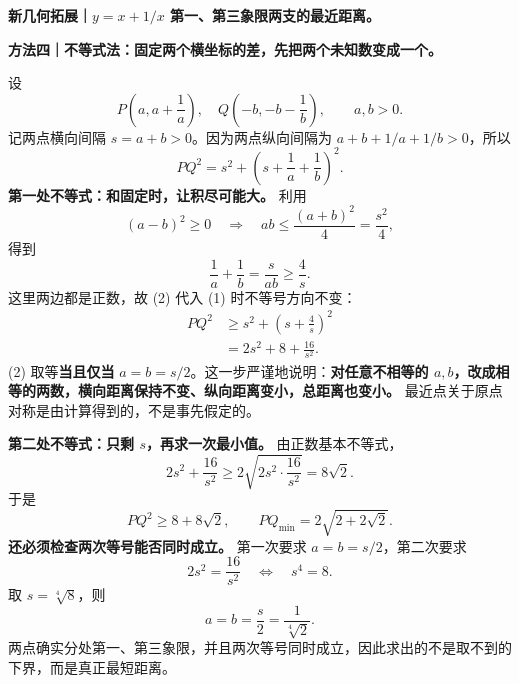 \clearpage
\begin{proofbox}
\textbf{新几何拓展｜$y=x+1/x$ 第一、第三象限两支的最近距离。}

\textbf{方法四｜不等式法：固定两个横坐标的差，先把两个未知数变成一个。}

设
\[
P\left(a,a+\frac1a\right),\quad
Q\left(-b,-b-\frac1b\right),\qquad a,b>0.
\]
记两点横向间隔 $s=a+b>0$。因为两点纵向间隔为 $a+b+1/a+1/b>0$，所以
\[
PQ^2=s^2+\left(s+\frac1a+\frac1b\right)^2.\tag{1}
\]
\textbf{第一处不等式：和固定时，让积尽可能大。} 利用
\[
(a-b)^2\ge0\quad\Longrightarrow\quad
ab\le\frac{(a+b)^2}{4}=\frac{s^2}{4},
\]
得到
\[
\boxed{\frac1a+\frac1b=\frac{s}{ab}\ge\frac4s}.\tag{2}
\]
这里两边都是正数，故 (2) 代入 (1) 时不等号方向不变：
\[
\begin{aligned}
PQ^2&\ge s^2+\left(s+\frac4s\right)^2\\
&=2s^2+8+\frac{16}{s^2}.
\end{aligned}\tag{3}
\]
(2) 取等\textbf{当且仅当} $a=b=s/2$。这一步严谨地说明：\textbf{对任意不相等的 $a,b$，改成相等的两数，横向距离保持不变、纵向距离变小，总距离也变小。} 最近点关于原点对称是由计算得到的，不是事先假定的。

\textbf{第二处不等式：只剩 $s$，再求一次最小值。} 由正数基本不等式，
\[
2s^2+\frac{16}{s^2}\ge 2\sqrt{2s^2\cdot\frac{16}{s^2}}=8\sqrt2.
\]
于是
\[
\boxed{PQ^2\ge8+8\sqrt2},\qquad
\boxed{PQ_{\min}=2\sqrt{2+2\sqrt2}}.
\]
\textbf{还必须检查两次等号能否同时成立。} 第一次要求 $a=b=s/2$，第二次要求
\[
2s^2=\frac{16}{s^2}\quad\Longleftrightarrow\quad s^4=8.
\]
取 $s=\sqrt[4]{8}$，则
\[
a=b=\frac{s}{2}=\frac1{\sqrt[4]2}.
\]
两点确实分处第一、第三象限，并且两次等号同时成立，因此求出的不是取不到的下界，而是真正最短距离。
\end{proofbox}

